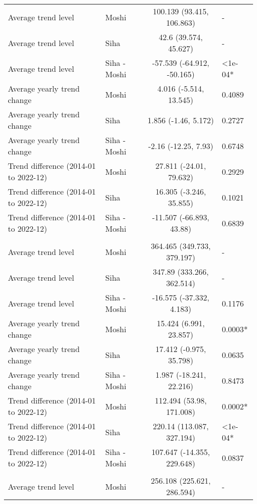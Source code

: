 \begin{longtable}{l|lcl}
\midrule\addlinespace[2.5pt]
\multicolumn{4}{l}{Other Cardiovascular Diseases} \\ 
\midrule\addlinespace[2.5pt]
Average trend level & Moshi & 100.139 (93.415, 106.863) & - \\ 
Average trend level & Siha & 42.6 (39.574, 45.627) & - \\ 
Average trend level & Siha - Moshi & -57.539 (-64.912, -50.165) & <1e-04* \\ 
Average yearly trend change & Moshi & 4.016 (-5.514, 13.545) & 0.4089 \\ 
Average yearly trend change & Siha & 1.856 (-1.46, 5.172) & 0.2727 \\ 
Average yearly trend change & Siha - Moshi & -2.16 (-12.25, 7.93) & 0.6748 \\ 
Trend difference (2014-01 to 2022-12) & Moshi & 27.811 (-24.01, 79.632) & 0.2929 \\ 
Trend difference (2014-01 to 2022-12) & Siha & 16.305 (-3.246, 35.855) & 0.1021 \\ 
Trend difference (2014-01 to 2022-12) & Siha - Moshi & -11.507 (-66.893, 43.88) & 0.6839 \\ 
\midrule\addlinespace[2.5pt]
\multicolumn{4}{l}{Peptic Ulcers} \\ 
\midrule\addlinespace[2.5pt]
Average trend level & Moshi & 364.465 (349.733, 379.197) & - \\ 
Average trend level & Siha & 347.89 (333.266, 362.514) & - \\ 
Average trend level & Siha - Moshi & -16.575 (-37.332, 4.183) & 0.1176 \\ 
Average yearly trend change & Moshi & 15.424 (6.991, 23.857) & 0.0003* \\ 
Average yearly trend change & Siha & 17.412 (-0.975, 35.798) & 0.0635 \\ 
Average yearly trend change & Siha - Moshi & 1.987 (-18.241, 22.216) & 0.8473 \\ 
Trend difference (2014-01 to 2022-12) & Moshi & 112.494 (53.98, 171.008) & 0.0002* \\ 
Trend difference (2014-01 to 2022-12) & Siha & 220.14 (113.087, 327.194) & <1e-04* \\ 
Trend difference (2014-01 to 2022-12) & Siha - Moshi & 107.647 (-14.355, 229.648) & 0.0837 \\ 
\midrule\addlinespace[2.5pt]
\multicolumn{4}{l}{Pneumonia, Severe} \\ 
\midrule\addlinespace[2.5pt]
Average trend level & Moshi & 256.108 (225.621, 286.594) & - \\ 

\end{longtable}
